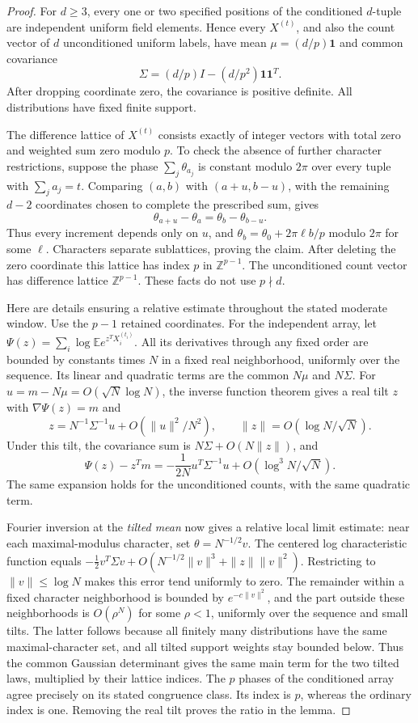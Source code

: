 \documentclass[11pt]{article}
\newcommand{\one}{\mathbf1}
\newcommand{\E}{\mathbb E}
\begin{document}
\begin{proof}
For $d\ge3$, every one or two specified positions of the conditioned
$d$-tuple are independent uniform field elements. Hence every
$X^{(t)}$, and also the count vector of $d$ unconditioned uniform
labels, have mean $\mu=(d/p)\one$ and common covariance
\[
 \Sigma=(d/p)I-(d/p^2)\one\one^T.
\]
After dropping coordinate zero, the covariance is positive definite.
All distributions have fixed finite support.

The difference lattice of $X^{(t)}$ consists exactly of integer vectors
with total zero and weighted sum zero modulo $p$. To check the absence
of further character restrictions, suppose the phase
$\sum_j\theta_{a_j}$ is constant modulo $2\pi$ over every tuple with
$\sum_ja_j=t$. Comparing $(a,b)$ with $(a+u,b-u)$, with the remaining
$d-2$ coordinates chosen to complete the prescribed sum, gives
\[
 \theta_{a+u}-\theta_a=\theta_b-\theta_{b-u}.
\]
Thus every increment depends only on $u$, and
$\theta_b=\theta_0+2\pi\ell b/p$ modulo $2\pi$ for some $\ell$.
Characters separate sublattices, proving the claim. After deleting the
zero coordinate this lattice has index $p$ in $\mathbb Z^{p-1}$.
The unconditioned count vector has difference lattice
$\mathbb Z^{p-1}$. These facts do not use $p\nmid d$.

Here are details ensuring a relative estimate throughout the stated
moderate window. Use the $p-1$ retained coordinates. For the independent
array, let $\Psi(z)=\sum_i\log\E e^{z^TX_i^{(t_i)}}$.
All its derivatives through any fixed order are bounded by constants
times $N$ in a fixed real neighborhood, uniformly over the sequence.
Its linear and quadratic terms are the common $N\mu$ and $N\Sigma$.
For $u=m-N\mu=O(\sqrt N\log N)$, the inverse function theorem gives
a real tilt $z$ with $\nabla\Psi(z)=m$ and
\[
 z=N^{-1}\Sigma^{-1}u+O(\|u\|^2/N^2),\qquad
 \|z\|=O(\log N/\sqrt N).
\]
Under this tilt, the covariance sum is $N\Sigma+O(N\|z\|)$, and
\[
 \Psi(z)-z^Tm=-\frac1{2N}u^T\Sigma^{-1}u
                 +O(\log^3N/\sqrt N).
\]
The same expansion holds for the unconditioned counts, with the same
quadratic term.

Fourier inversion at the \emph{tilted mean} now gives a relative local
limit estimate: near each maximal-modulus character, set
$\theta=N^{-1/2}v$. The centered log characteristic function equals
$-\tfrac12v^T\Sigma v+O(N^{-1/2}\|v\|^3+\|z\|\|v\|^2)$.
Restricting to $\|v\|\le\log N$ makes this error tend uniformly to
zero. The remainder within a fixed character neighborhood is bounded
by $e^{-c\|v\|^2}$, and the part outside these neighborhoods is
$O(\rho^N)$ for some $\rho<1$, uniformly over the sequence and small
tilts. The latter follows because all finitely many distributions have
the same maximal-character set, and all tilted support weights stay
bounded below. Thus the common Gaussian determinant gives the same
main term for the two tilted laws, multiplied by their lattice indices.
The $p$ phases of the conditioned array agree precisely on its stated
congruence class. Its index is $p$, whereas the ordinary index is one.
Removing the real tilt proves the ratio in the lemma.
\end{proof}
\end{document}
